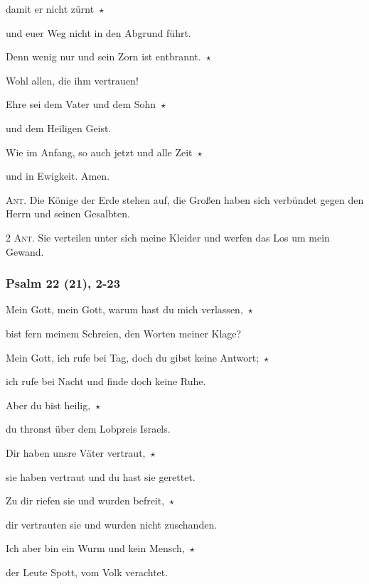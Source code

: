 \noindent damit er nicht zürnt~$\star$~\nopagebreak

und euer Weg nicht in den Abgrund führt. 
 
\noindent Denn wenig nur und sein Zorn ist entbrannt.~$\star$~\nopagebreak

Wohl allen, die ihm vertrauen!

\noindent Ehre sei dem Vater und dem Sohn~$\star$~\nopagebreak

und dem Heiligen Geist.

\noindent Wie im Anfang, so auch jetzt und alle Zeit~$\star$~\nopagebreak

und in Ewigkeit. Amen.

\vspace{10pt}

\noindent \textsc{Ant.} Die Könige der Erde stehen auf, die Großen haben sich verbündet gegen den Herrn und seinen Gesalbten.

\vspace{10pt}


\noindent \textsc{2 Ant.} Sie verteilen unter sich meine Kleider und werfen das Los um mein Gewand.

\subsubsection{Psalm 22 (21), 2-23}

\noindent Mein Gott, mein Gott, warum hast du mich verlassen,~$\star$~\nopagebreak

bist fern meinem Schreien, den Worten meiner Klage?
 
\noindent Mein Gott, ich rufe bei Tag, doch du gibst keine Antwort;~$\star$~\nopagebreak

ich rufe bei Nacht und finde doch keine Ruhe.
 
\noindent Aber du bist heilig,~$\star$~\nopagebreak

du thronst über dem Lobpreis Israels.
 
\noindent Dir haben unsre Väter vertraut,~$\star$~\nopagebreak

sie haben vertraut und du hast sie gerettet.
 
\noindent Zu dir riefen sie und wurden befreit,~$\star$~\nopagebreak

dir vertrauten sie und wurden nicht zuschanden.
 
\noindent Ich aber bin ein Wurm und kein Mensch,~$\star$~\nopagebreak

der Leute Spott, vom Volk verachtet.
 
